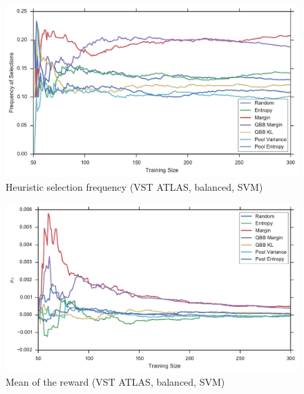 \begin{figure}[p]
	\centering
	\includegraphics[width=\textwidth]{figures/5_thompson/vstatlas_br_frequencies}
	\caption[Heuristic selection frequency (VST ATLAS, balanced, SVM)]{
		Heuristic selection frequency (VST ATLAS, balanced, SVM)}
	\label{fig:vstatlas_br_frequencies}
\end{figure}

\begin{figure}[p]
	\centering
	\includegraphics[width=\textwidth]{figures/5_thompson/vstatlas_br_mus}
	\caption[Mean of the reward (VST ATLAS, balanced, SVM)]{
		Mean of the reward (VST ATLAS, balanced, SVM)}
\end{figure}

